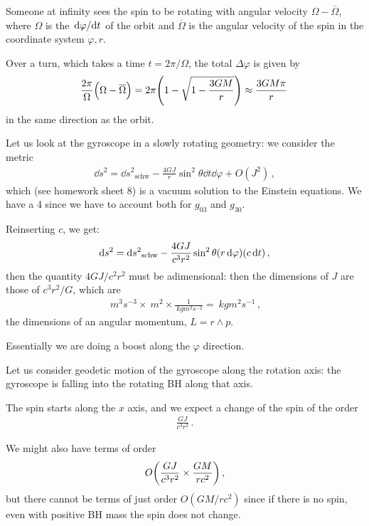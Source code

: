 \documentclass[main.tex]{subfiles}
\begin{document}
Someone at infinity sees the spin to be rotating with angular velocity \(\Omega - \overline{\Omega}\), where \(\Omega \) is the \(\dv*{\varphi }{t}\) of the orbit and \(\overline{\Omega}\) is the angular velocity of the spin in the coordinate system \(\varphi , r\). 

Over a turn, which takes a time \(t = 2 \pi / \Omega \), the total \(\Delta \varphi \) is given by 
%
\begin{align}
  \frac{2\pi}{\Omega } \qty( \Omega - \overline{\Omega})
  = 2 \pi \qty(1 - \sqrt{1 - \frac{3GM}{r}})
  \approx \frac{3GM\pi}{r} 
\,
\end{align}
%
in the same direction as the orbit. 

Let us look at the gyroscope in a slowly rotating geometry: we consider the metric 
%
\begin{align}
  \dd{s^2} = \dd{s^2}_{\text{schw}} - \frac{4 GJ}{r} \sin^2 \theta \dd{t} \dd{\varphi } + O(J^2)
\,,
\end{align}
%
which (see homework sheet 8) is a vacuum solution to the Einstein equations. We have a 4 since we have to account both for \(g_{03} \) and \(g_{30} \). 

Reinserting  \(c\), we get: 
%
\begin{align}
  \dd{s^2} = \dd{s^2}_{\text{schw}} - \frac{4GJ}{c^3r^2} \sin^2\theta \qty(r \dd{\varphi }) \qty(c \dd{t})
\,,
\end{align}
%
then the quantity \(4GJ / c^2 r^2\) must be adimensional: then the dimensions of \(J\) are those of \(c^3 r^2 / G\), which are 
%
\begin{align}
  \SI{}{m^3 s^{-3}} \times \SI{}{m^2} \times \frac{1}{\SI{}{kg m^3 s^{-2}}} = \SI{}{kg m^2 s^{-1}} 
\,,
\end{align}
%
the dimensions of an angular momentum, \(L = r \wedge p\). 

Essentially we are doing a boost along the \(\varphi \) direction. 

Let us consider geodetic motion of the gyroscope along the rotation axis: the gyroscope is falling into the rotating BH along that axis. 

The spin starts along the \(x\) axis, and we expect a change of the spin of the order 
%
\begin{align}
  \frac{GJ}{c^3r^2}
\,.
\end{align}

We might also have terms of order 
%
\begin{align}
  O \qty(\frac{GJ}{c^3r^2} \times \frac{GM}{rc^2 })
\,,
\end{align}
%
but there cannot be terms of just order \(O(GM/rc^2)\) since if there is no spin, even with positive BH mass the spin does not change. 
\end{document}
